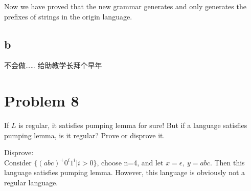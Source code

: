 \documentclass[a4paper,UTF8]{ctexart}
\theoremstyle{definition}
\begin{document}
	Now we have proved that the new grammar generates and only generates the prefixes of strings 
	in the origin language.

\subsection*{b}

不会做…… 给助教学长拜个早年


\section*{Problem 8}
If $L$ is regular, it satisfies pumping lemma for sure! But if a language satisfies pumping lemma, is it regular? Prove or disprove it.

Disprove:\\
Consider $\{(abc)^+0^i1^i|i>0\}$, choose n=4, and let $x=\epsilon,\ y=abc$. Then this language satisfies pumping lemma. However, this language is obviously not 
a regular language.
\end{document}
